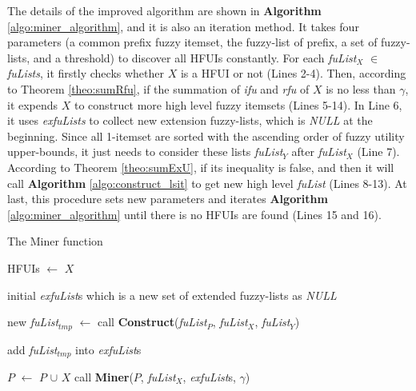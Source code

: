 \documentclass[journal]{IEEEtran}
\begin{document}
The details of the improved algorithm are shown in \textbf{Algorithm} \ref{algo:miner_algorithm}, and it is also an iteration method. It takes four parameters (a common prefix fuzzy itemset, the fuzzy-list of prefix, a set of fuzzy-lists, and a threshold) to discover all HFUIs constantly. For each \textit{fuList}$_X$ $\in$ \textit{fuLists}, it firstly checks whether $X$ is a HFUI or not (Lines 2-4). Then, according to Theorem \ref{theo:sumRfu}, if the summation of \textit{ifu} and \textit{rfu} of $X$ is no less than $\gamma$, it expends $X$ to construct more high level fuzzy itemsets (Lines 5-14). In Line 6, it uses \textit{exfuLists} to collect new extension fuzzy-lists, which is \textit{NULL} at the beginning. Since all 1-itemset are sorted with the ascending order of fuzzy utility upper-bounds, it just needs to consider these lists \textit{fuList}$_Y$ after \textit{fuList}$_X$ (Line 7). According to Theorem \ref{theo:sumExU}, if its inequality is false, and then it will call \textbf{Algorithm} \ref{algo:construct_lsit} to get new high level \textit{fuList} (Lines 8-13). At last, this procedure sets new parameters and iterates \textbf{Algorithm} \ref{algo:miner_algorithm} until there is no HFUIs are found (Lines 15 and 16).


\begin{algorithm}[h]
	\caption{The Miner function}
	\label{algo:miner_algorithm}
	\LinesNumbered
	
	 {
		 {
			HFUIs $\leftarrow$ $X$\;
		}
		
		 {
			initial \textit{exfuList}s which is a new set of extended fuzzy-lists as \textit{NULL}\;
			
			 {
				 {
					new \textit{fuList}$_{tmp}$ $\leftarrow$ call \textbf{Construct}(\textit{fuList}$_P$, \textit{fuList}$_X$, \textit{fuList}$_Y$)\;
					
					 {
						add \textit{fuList}$_{tmp}$ into \textit{exfuList}s\;
					}
				}
			}
			
			$P$ $\leftarrow$ $P$ $\cup$ $X$\;
			call \textbf{Miner}($P$, \textit{fuList}$_X$, \textit{exfuList}s, $\gamma$)\;
		}
	}
\end{algorithm}
\end{document}
